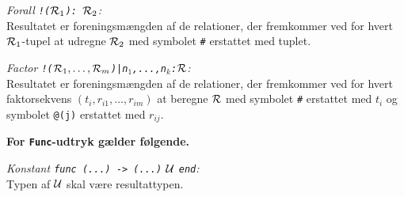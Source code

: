 {\em Forall \verb"!("${\cal R}_1$\verb"): "${\cal R}_2$:}\\
Resultatet er foreningsm\ae{}ngden af de relationer, 
der fremkommer ved for hvert
${\cal R}_1$-tupel at  udregne ${\cal R}_2$ med symbolet
\verb"#" erstattet med tuplet.

{\em Factor \verb"!("${\cal R}_1,\ldots,{\cal R}_m$\verb")|"\verb"n"$_1$\verb",...,n"$_k$\verb":"${\cal R}$:}\\
Resultatet er foreningsm\ae{}ngden af de relationer,
der fremkommer ved for hvert faktorsekvens $(t_i,r_{i1},\ldots,r_{im})$ at
beregne ${\cal R}$ med symbolet
\verb"#" erstattet med $t_i$ og symbolet \verb"@(j)" erstattet med $r_{ij}$.

{\bf For \verb"Func"-udtryk g\ae{}lder f\o{}lgende.}

{\em Konstant \verb"func (...) -> (...)" $\cal U$ \verb"end":}\\
Typen af $\cal U$ skal v\ae{}re resultattypen.

